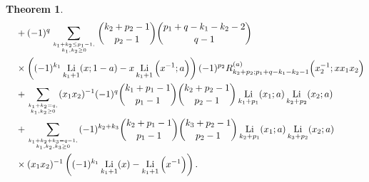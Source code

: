 \documentclass[11pt]{article}
\DeclareMathOperator{\Li}{Li}
\theoremstyle{plain}
\newtheorem{thm}{Theorem}[section]
\theoremstyle{definition}
\begin{document}
\begin{thm}
\begin{align}
	&\quad+(-1)^q \sum_{k_1+k_2\leq p_1-1,\atop k_1,k_2\geq 0} \binom{k_2+p_2-1}{p_2-1}\binom{p_1+q-k_1-k_2-2}{q-1} \nonumber\\
	&\quad\times\left((-1)^{k_1}\Li_{k_1+1}(x;1-a)-x \Li_{k_1+1}\Big(x^{-1};a\Big)\right)(-1)^{p_2}R^{(a)}_{k_2+p_2;p_1+q-k_1-k_2-1}\Big(x_2^{-1};xx_1x_2\Big)\nonumber\\
	&\quad+\sum_{k_1+k_2=q,\atop k_1,k_2\geq 0}(x_1x_2)^{-1} (-1)^q \binom{k_1+p_1-1}{p_1-1}\binom{k_2+p_2-1}{p_2-1}\Li_{k_1+p_1}(x_1;a)\Li_{k_2+p_2}(x_2;a)\nonumber\\
	&\quad+\sum_{k_1+k_2+k_3=q-1,\atop k_1,k_2,k_3\geq 0}(-1)^{k_2+k_3}\binom{k_2+p_1-1}{p_1-1}\binom{k_3+p_2-1}{p_2-1}\Li_{k_2+p_1}(x_1;a)\Li_{k_3+p_2}(x_2;a)\nonumber\\
	&\quad\times(x_1x_2)^{-1}\left((-1)^{k_1}\Li_{{k_1}+1}(x)- \Li_{{k_1}+1}\Big(x^{-1}\Big)\right).
\end{align}
\end{thm}
\end{document}
